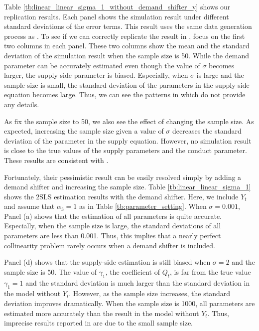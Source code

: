 \documentclass[11pt, a4paper]{article}
\begin{document}
Table \ref{tb:linear_linear_sigma_1_without_demand_shifter_y} shows our replication results.
Each panel shows the simulation result under different standard deviations of the error terms.
This result uses the same data generation process as \citet{perloff2012collinearity}. 
To see if we can correctly replicate the result in \cite{perloff2012collinearity}, focus on the first two columns in each panel.
These two columns show the mean and the standard deviation of the simulation result when the sample size is 50.
While the demand parameter can be accurately estimated even though the value of $\sigma$ becomes larger, the supply side parameter is biased.
Especially, when $\sigma$ is large and the sample size is small, the standard deviation of the parameters in the supply-side equation becomes large.
Thus, we can see the patterns in \citet{perloff2012collinearity} which do not provide any details.

As \cite{perloff2012collinearity} fix the sample size to 50, we also see the effect of changing the sample size.
As expected, increasing the sample size given a value of $\sigma$ decreases the standard deviation of the parameter in the supply equation.
However, no simulation result is close to the true values of the supply parameters and the conduct parameter.
These results are consistent with \cite{perloff2012collinearity}.

Fortunately, their pessimistic result can be easily resolved simply by adding a demand shifter and increasing the sample size.
Table \ref{tb:linear_linear_sigma_1} shows the 2SLS estimation results with the demand shifter.
Here, we include $Y_t$ and assume that $\alpha_3 = 1$ as in Table \ref{tb:parameter_setting}.
When $\sigma = 0.001$, Panel (a) shows that the estimation of all parameters is quite accurate.
Especially, when the sample size is large, the standard deviations of all parameters are less than 0.001. 
Thus, this implies that a nearly perfect collinearity problem rarely occurs when a demand shifter is included.

Panel (d) shows that the supply-side estimation is still biased when $\sigma = 2$ and the sample size is 50.
The value of $\gamma_1$, the coefficient of $Q_t$, is far from the true value $\gamma_1 = 1$ and the standard deviation is much larger than the standard deviation in the model without $Y_t$.
However, as the sample size increases, the standard deviation improves dramatically. 
When the sample size is 1000, all parameters are estimated more accurately than the result in the model without $Y_t$.
Thus, imprecise results reported in \cite{perloff2012collinearity} are due to the small sample size.
\end{document}

